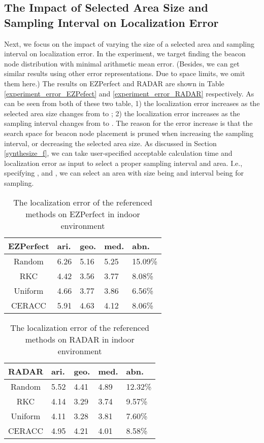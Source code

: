 \documentclass[10pt, conference, letterpaper]{IEEEtran}
\begin{document}
\subsection{The Impact of Selected Area Size and Sampling Interval on Localization Error}
Next, we focus on the impact of varying the size of a selected area and sampling interval on localization error. In the experiment, we target finding the beacon node distribution with minimal arithmetic mean error. (Besides, we can get similar results using other error representations. Due to space limits, we omit them here.) The results on EZPerfect and RADAR are shown in Table \ref{experiment_error_EZPefect} and \ref{experiment_error_RADAR} respectively. As can be seen from both of these two table, 1) the localization error increases as the selected area size changes from  to ; 2) the localization error increases as the sampling interval changes from  to . The reason for the error increase is that the search space for beacon node placement is pruned when increasing the sampling interval, or decreasing the selected area size. As discussed in Section \ref{synthesize_f}, we can take user-specified acceptable calculation time  and localization error  as input to select a proper sampling interval and area. I.e., specifying , and , we can select an area with size being  and interval being  for sampling.

\begin{table}[!t]
\renewcommand{\arraystretch}{1.0}
\caption{The localization error of the referenced methods on EZPerfect in indoor environment} \label{experiment_error_referenced_EZPerfect}
\centering
\begin{tabular}{|c|p{0.9cm}|p{0.9cm}|p{0.9cm}|p{0.9cm}|}
  \hline
EZPerfect  & ari. & geo. & med. & abn. \\
  \hline
  Random & 6.26 & 5.16 & 5.25 & 15.09\% \\
  \hline
  RKC & 4.42 & 3.56 & 3.77 & 8.08\% \\
  \hline
  Uniform & 4.66 & 3.77 & 3.86 & 6.56\% \\
  \hline
  CERACC & 5.91 & 4.63 & 4.12 & 8.06\% \\
  \hline
\end{tabular}
\end{table}

\begin{table}[!t]
\renewcommand{\arraystretch}{1.0}
\caption{The localization error of the referenced methods on RADAR in indoor environment} \label{experiment_error_referenced_RADAR}
\centering
\begin{tabular}{|c|p{0.9cm}|p{0.9cm}|p{0.9cm}|p{0.9cm}|}
  \hline
RADAR  & ari. & geo. & med. & abn. \\
  \hline
  Random & 5.52 & 4.41 & 4.89 & 12.32\% \\
  \hline
  RKC & 4.14 & 3.29 & 3.74 & 9.57\% \\
  \hline
  Uniform & 4.11 & 3.28 & 3.81 & 7.60\% \\
  \hline
  CERACC & 4.95 & 4.21 & 4.01 & 8.58\% \\
  \hline
\end{tabular}
\end{table}
\end{document}
